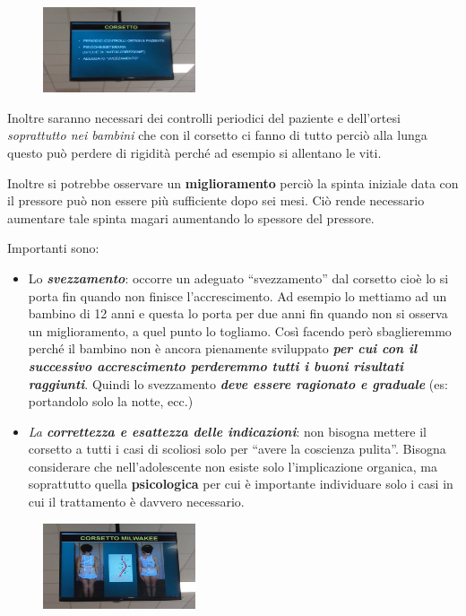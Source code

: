 \begin{figure}[!ht]
\centering
\includegraphics[width=0.4\textwidth]{013/image2.jpeg}
\end{figure}

Inoltre saranno necessari dei controlli periodici del paziente e dell'ortesi \emph{soprattutto nei bambini} che con il corsetto ci fanno di tutto perciò alla lunga questo può perdere di rigidità perché ad esempio si allentano le viti.

Inoltre si potrebbe osservare un \textbf{miglioramento} perciò la spinta iniziale data con il pressore può non essere più sufficiente dopo sei mesi. Ciò rende necessario aumentare tale spinta magari aumentando lo spessore del pressore.

Importanti sono:
\begin{itemize}
\item
  Lo \textbf{\emph{svezzamento}}: occorre un adeguato ``svezzamento'' dal corsetto cioè lo si porta fin quando non finisce l'accrescimento. Ad esempio lo mettiamo ad un bambino di 12 anni e questa lo porta per due anni fin quando non si osserva un miglioramento, a quel punto lo togliamo. Così facendo però sbaglieremmo perché il bambino non è ancora pienamente sviluppato \textbf{\emph{per cui con il successivo accrescimento perderemmo tutti i buoni risultati raggiunti}}. Quindi lo svezzamento \textbf{\emph{deve essere ragionato e graduale}} (es: portandolo solo la notte, ecc.)
\item
  \emph{La \textbf{correttezza e esattezza delle indicazioni}}: non bisogna mettere il corsetto a tutti i casi di scoliosi solo per ``avere la coscienza pulita''. Bisogna considerare che nell'adolescente non esiste solo l'implicazione organica, ma soprattutto quella \textbf{psicologica} per cui è importante individuare solo i casi in cui il trattamento è davvero necessario.
\end{itemize}

\begin{figure}[!ht]
\centering
\includegraphics[width=0.4\textwidth]{013/image3.jpeg}
\end{figure}

